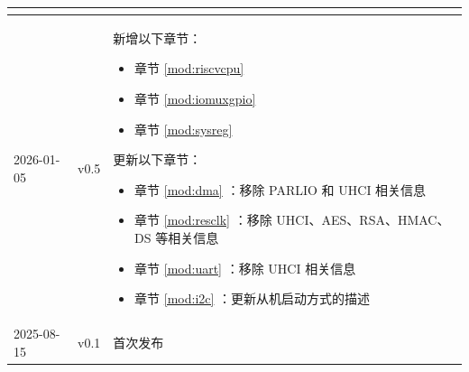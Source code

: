 \begin{longtable}[l]{ | m{2cm} | m{1.5cm} | m{12cm} | }
\begin{itemize}
    \end{itemize}
    \\\hline
    2026-01-05 & v0.5 &
    新增以下章节：
    \begin{itemize}
        \item 章节 \ref{mod:riscvcpu} \textit{\nameref{mod:riscvcpu}}
        \item 章节 \ref{mod:iomuxgpio} \textit{\nameref{mod:iomuxgpio}}
        \item 章节 \ref{mod:sysreg} \textit{\nameref{mod:sysreg}}
    \end{itemize}
    更新以下章节：
    \begin{itemize}
        \item 章节 \ref{mod:dma} \textit{\nameref{mod:dma}}：移除 PARLIO 和 UHCI 相关信息
        \item 章节 \ref{mod:resclk} \textit{\nameref{mod:resclk}}：移除 UHCI、AES、RSA、HMAC、DS 等相关信息
        \item 章节 \ref{mod:uart} \textit{\nameref{mod:uart}}：移除 UHCI 相关信息 %
        \item 章节 \ref{mod:i2c} \textit{\nameref{mod:i2c}}：更新从机启动方式的描述 %
    \end{itemize}
    \\\hline
    2025-08-15 & v0.1 & 首次发布\\\hline
\end{longtable}
